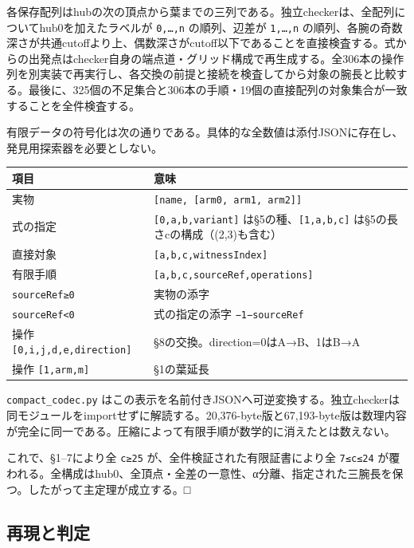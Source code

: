 \documentclass[
  10pt,
  a4paper,
]{article}
\let\originaltexttt\texttt
\renewcommand{\texttt}[1]{\leavevmode\allowbreak\mbox{\originaltexttt{#1}}}
\begin{document}
各保存配列はhubの次の頂点から葉までの三列である。独立checkerは、全配列についてhub0を加えたラベルが
\texttt{0,…,n} の順列、辺差が \texttt{1,…,n}
の順列、各腕の奇数深さが共通cutoffより上、偶数深さがcutoff以下であることを直接検査する。式からの出発点はchecker自身の端点道・グリッド構成で再生成する。全306本の操作列を別実装で再実行し、各交換の前提と接続を検査してから対象の腕長と比較する。最後に、325個の不足集合と306本の手順・19個の直接配列の対象集合が一致することを全件検査する。

\Needspace{190pt}
有限データの符号化は次の通りである。具体的な全数値は添付JSONに存在し、発見用探索器を必要としない。

\begin{center}
\begin{tabular}{@{}>{\raggedright\arraybackslash}p{.30\linewidth}>{\raggedright\arraybackslash}p{.65\linewidth}@{}}
\toprule\noalign{}
項目 & 意味 \\
\midrule\noalign{}
実物 & \texttt{{[}name,\ {[}arm0,\ arm1,\ arm2{]}{]}} \\
式の指定 & \texttt{{[}0,a,b,variant{]}} は§5の種、\texttt{{[}1,a,b,c{]}}
は§5の長さcの構成（(2,3)も含む） \\
直接対象 & \texttt{{[}a,b,c,witnessIndex{]}} \\
有限手順 & \texttt{{[}a,b,c,sourceRef,operations{]}} \\
\texttt{sourceRef≥0} & 実物の添字 \\
\texttt{sourceRef\textless{}0} & 式の指定の添字 \texttt{−1−sourceRef} \\
操作 \texttt{{[}0,i,j,d,e,direction{]}} &
§8の交換。direction=0はA→B、1はB→A \\
操作 \texttt{{[}1,arm,m{]}} & §1の葉延長 \\
\bottomrule
\end{tabular}
\end{center}

\texttt{compact\_codec.py}
はこの表示を名前付きJSONへ可逆変換する。独立checkerは同モジュールをimportせずに解読する。20,376-byte版と67,193-byte版は数理内容が完全に同一である。圧縮によって有限手順が数学的に消えたとは数えない。

これで、§1--7により全 \texttt{c≥25} が、全件検証された有限証書により全
\texttt{7≤c≤24}
が覆われる。全構成はhub0、全頂点・全差の一意性、α分離、指定された三腕長を保つ。したがって主定理が成立する。□

\subsection{再現と判定}\label{ux518dux73feux3068ux5224ux5b9a}
\end{document}
